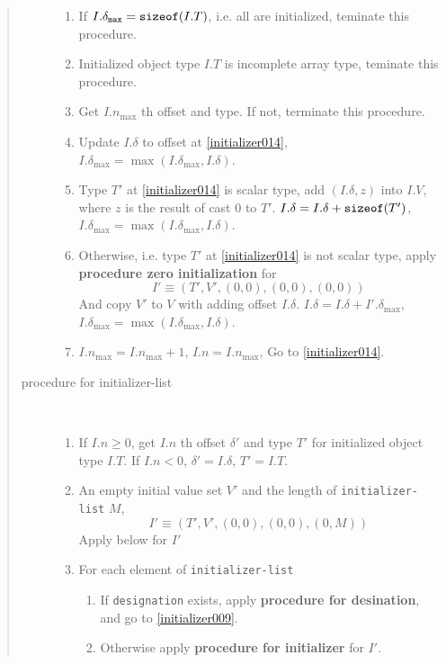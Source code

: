 \begin{quotation}
\begin{description}
\begin{enumerate}
\item If $I.\delta_{\tt{max}} = {\tt sizeof}(I.T)$, i.e.
      all are initialized, teminate this procedure.

\item Initialized object type $I.T$ is incomplete array type,
      teminate this procedure.

\item \label{initializer014} 
      Get $I.n_{\max}$ th offset and type. If not, terminate
      this procedure.

\item Update $I.\delta$ to offset at \ref{initializer014},
      $I.\delta_{\max} = {\max}({I.\delta}_{\max},I.{\delta})$.

\item Type $T'$ at \ref{initializer014} is scalar type,
      add $(I.\delta,z)$ into $I.V$, where $z$ is the result of
      cast $0$ to $T'$.
      $I.\delta = I.\delta + {\tt{sizeof}}(T')$,
       $I.\delta_{\max} = {\max}(I.{\delta}_{\max},I.{\delta})$.

\item Otherwise, i.e. type $T'$ at \ref{initializer014} is not scalar
      type, apply {\bf procedure zero initialization} for
\[
 I' \equiv (T',V',(0,0),(0,0),(0,0))
\]
And copy $V'$ to $V$ with adding offset $I.\delta$.
$I.\delta = I.\delta + I'.{\delta_{\max}}$,
$I.\delta_{\max} = {\max}(I.\delta_{\max},I.\delta)$.

\item $I.n_{\max} = I.n_{\max} + 1$, $I.n = I.n_{\max}$,
Go to \ref{initializer014}.
\end{enumerate}


\item[procedure for initializer-list]

\

\begin{enumerate}
\item \label{initializer005}
      If $I.n \ge 0$, get $I.n$ th offset ${\delta}'$ and
      type $T'$ for initialized object type $I.T$.
      If $I.n < 0$, ${\delta}' = I.{\delta}$, $T' = I.T$.
\item An empty initial value set $V'$ and the length of
      {\tt{initializer-list}} $M$,
\[
 I' \equiv (T',V',(0,0),(0,0),(0,M))
\]
Apply below for $I'$

\item \label{initializer009}

For each element of {\tt{initializer-list}}
\begin{enumerate}
\item If {\tt{designation}} exists,
      apply {\bf procedure for desination}, and go to \ref{initializer009}.
\item Otherwise apply {\bf procedure for initializer} for $I'$.
\end{enumerate}


\end{enumerate}
\end{description}
\end{quotation}
